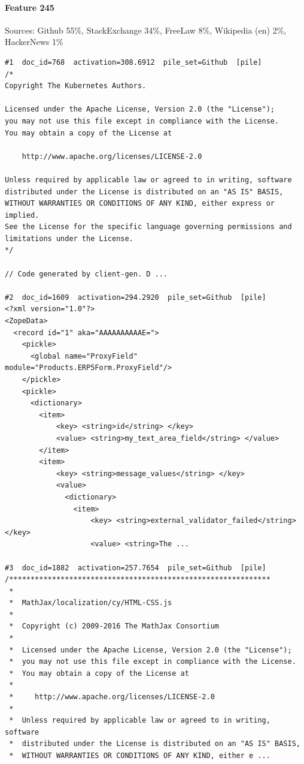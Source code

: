 \paragraph*{Feature 245} Sources: Github 55\%, StackExchange 34\%, FreeLaw 8\%, Wikipedia (en) 2\%, HackerNews 1\%

\begin{verbatim}
#1  doc_id=768  activation=308.6912  pile_set=Github  [pile]
/*
Copyright The Kubernetes Authors.

Licensed under the Apache License, Version 2.0 (the "License");
you may not use this file except in compliance with the License.
You may obtain a copy of the License at

    http://www.apache.org/licenses/LICENSE-2.0

Unless required by applicable law or agreed to in writing, software
distributed under the License is distributed on an "AS IS" BASIS,
WITHOUT WARRANTIES OR CONDITIONS OF ANY KIND, either express or implied.
See the License for the specific language governing permissions and
limitations under the License.
*/

// Code generated by client-gen. D ...

#2  doc_id=1609  activation=294.2920  pile_set=Github  [pile]
<?xml version="1.0"?>
<ZopeData>
  <record id="1" aka="AAAAAAAAAAE=">
    <pickle>
      <global name="ProxyField" module="Products.ERP5Form.ProxyField"/>
    </pickle>
    <pickle>
      <dictionary>
        <item>
            <key> <string>id</string> </key>
            <value> <string>my_text_area_field</string> </value>
        </item>
        <item>
            <key> <string>message_values</string> </key>
            <value>
              <dictionary>
                <item>
                    <key> <string>external_validator_failed</string> </key>
                    <value> <string>The ...

#3  doc_id=1882  activation=257.7654  pile_set=Github  [pile]
/*************************************************************
 *
 *  MathJax/localization/cy/HTML-CSS.js
 *
 *  Copyright (c) 2009-2016 The MathJax Consortium
 *
 *  Licensed under the Apache License, Version 2.0 (the "License");
 *  you may not use this file except in compliance with the License.
 *  You may obtain a copy of the License at
 *
 *     http://www.apache.org/licenses/LICENSE-2.0
 *
 *  Unless required by applicable law or agreed to in writing, software
 *  distributed under the License is distributed on an "AS IS" BASIS,
 *  WITHOUT WARRANTIES OR CONDITIONS OF ANY KIND, either e ...


\end{verbatim}
